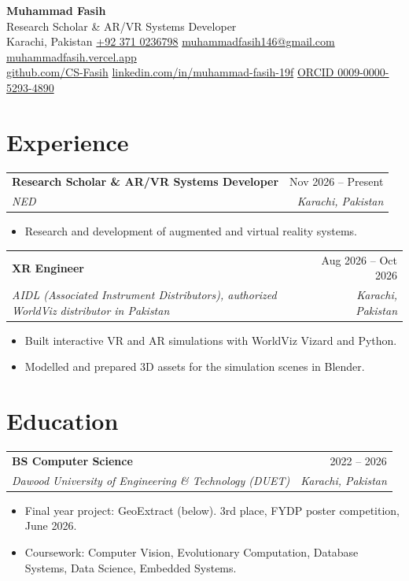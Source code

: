 \documentclass[a4paper,10pt]{article}
\makeatletter
\newcommand{\entry}[4]{%
  \begin{tabularx}{\linewidth}{@{}X r@{}}
    \textbf{#1} & #2 \\
    \textit{#3} & \textit{\color{muted}#4} \\
  \end{tabularx}\vspace{1pt}}
\makeatother
\begin{document}
\begin{center}
  {\fontsize{22}{24}\selectfont\textbf{Muhammad Fasih}}\\[4pt]
  {\color{muted}Research Scholar \& AR/VR Systems Developer}\\[4pt]
  \small
  Karachi, Pakistan \;\textperiodcentered\;
  \href{tel:+923710236798}{+92 371 0236798} \;\textperiodcentered\;
  \href{mailto:muhammadfasih146@gmail.com}{muhammadfasih146@gmail.com} \;\textperiodcentered\;
  \href{https://muhammadfasih.vercel.app}{muhammadfasih.vercel.app}\\[1pt]
  \href{https://github.com/CS-Fasih}{github.com/CS-Fasih} \;\textperiodcentered\;
  \href{https://linkedin.com/in/muhammad-fasih-19f}{linkedin.com/in/muhammad-fasih-19f} \;\textperiodcentered\;
  \href{https://orcid.org/0009-0000-5293-4890}{ORCID 0009-0000-5293-4890}
\end{center}
\vspace{-4pt}

\section{Experience}
\entry{Research Scholar \& AR/VR Systems Developer}{Nov 2026 -- Present}{NED}{Karachi, Pakistan}
\begin{itemize}
  \item Research and development of augmented and virtual reality systems.
\end{itemize}
\vspace{2pt}

\entry{XR Engineer}{Aug 2026 -- Oct 2026}{AIDL (Associated Instrument Distributors), authorized WorldViz distributor in Pakistan}{Karachi, Pakistan}
\begin{itemize}
  \item Built interactive VR and AR simulations with WorldViz Vizard and Python.
  \item Modelled and prepared 3D assets for the simulation scenes in Blender.
\end{itemize}

\section{Education}
\entry{BS Computer Science}{2022 -- 2026}{Dawood University of Engineering \& Technology (DUET)}{Karachi, Pakistan}
\begin{itemize}
  \item Final year project: GeoExtract (below). 3rd place, FYDP poster competition, June 2026.
  \item Coursework: Computer Vision, Evolutionary Computation, Database Systems, Data Science, Embedded Systems.
\end{itemize}
\end{document}
